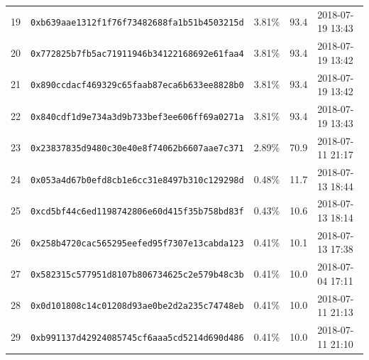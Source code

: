{\begin{longtable}{r p{7.4cm} r r p{2.6cm}}
19 & \texttt{0xb639aae1312f1f76f73482688fa1b51b4503215d} & 3.81\% & 93.4 & 2018-07-19 13:43\\
20 & \texttt{0x772825b7fb5ac71911946b34122168692e61faa4} & 3.81\% & 93.4 & 2018-07-19 13:42\\
21 & \texttt{0x890ccdacf469329c65faab87eca6b633ee8828b0} & 3.81\% & 93.4 & 2018-07-19 13:42\\
22 & \texttt{0x840cdf1d9e734a3d9b733bef3ee606ff69a0271a} & 3.81\% & 93.4 & 2018-07-19 13:43\\
23 & \texttt{0x23837835d9480c30e40e8f74062b6607aae7c371} & 2.89\% & 70.9 & 2018-07-11 21:17\\
24 & \texttt{0x053a4d67b0efd8cb1e6cc31e8497b310c129298d} & 0.48\% & 11.7 & 2018-07-13 18:44\\
25 & \texttt{0xcd5bf44c6ed1198742806e60d415f35b758bd83f} & 0.43\% & 10.6 & 2018-07-13 18:14\\
26 & \texttt{0x258b4720cac565295eefed95f7307e13cabda123} & 0.41\% & 10.1 & 2018-07-13 17:38\\
27 & \texttt{0x582315c577951d8107b806734625c2e579b48c3b} & 0.41\% & 10.0 & 2018-07-04 17:11\\
28 & \texttt{0x0d101808c14c01208d93ae0be2d2a235c74748eb} & 0.41\% & 10.0 & 2018-07-11 21:13\\
29 & \texttt{0xb991137d42924085745cf6aaa5cd5214d690d486} & 0.41\% & 10.0 & 2018-07-11 21:10\\
\bottomrule\end{longtable}}
